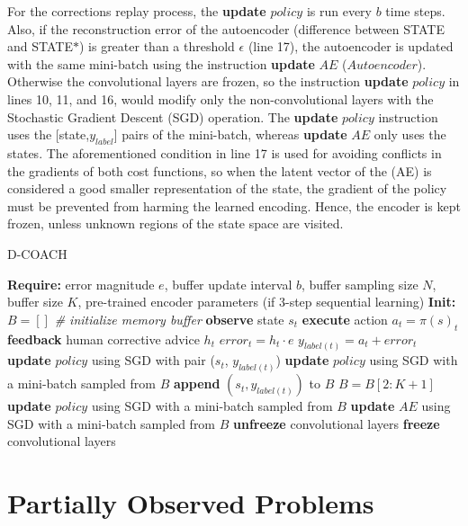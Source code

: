 For the corrections replay process, the \textbf{update} $policy$ is run every $b$ time steps. Also, if the reconstruction error of the autoencoder (difference between STATE and STATE$*$) is greater than a threshold $\epsilon$ (line 17), the autoencoder is updated with the same mini-batch using the instruction \textbf{update} $AE$ ($Autoencoder$). Otherwise the convolutional layers are frozen, so the instruction \textbf{update} $policy$ in lines 10, 11, and 16, would modify only the non-convolutional layers with the Stochastic Gradient Descent (SGD) operation. The \textbf{update} $policy$ instruction uses the [state,$y_{label}$] pairs of the mini-batch, whereas \textbf{update} $AE$ only uses the states. The aforementioned condition in line 17 is used for avoiding conflicts in the gradients of both cost functions, so when the latent vector of the (AE) is considered a good smaller representation of the state, the gradient of the policy must be prevented from harming the learned encoding. Hence, the encoder is kept frozen, unless unknown regions of the state space are visited.

\begin{algorithm}[t]
\caption{D-COACH }\label{algorithm:DeepCOACH}
\begin{algorithmic}[1]
\State \textbf{Require:} error magnitude $\textit{e}$, buffer update interval $b$, buffer sampling size $N$, buffer size $K$, pre-trained encoder parameters (if 3-step sequential learning) 
\State \textbf{Init:} $B = []$ \emph{\# initialize memory buffer}
\State \textbf{observe} state $s_{t}$
\State \textbf{execute} action $a_{t}=\pi(s)_{t}$
\State \textbf{feedback} human corrective advice $h_{t}$
\State $error_{t} = h_{t}\cdot e$
\State $y_{label(t)} = a_{t} + error_{t}$ 
\State \textbf{update} $policy$ using SGD with pair ($s_{t}$, $y_{label(t)}$) 
\State \textbf{update} $policy$ using SGD with a mini-batch sampled from $B$
\State \textbf{append} $(s_{t}, y_{label(t)})$ to $B$
\State $B = B[2:K+1]$
\EndIf
\EndIf
{}
\State \textbf{update} $policy$ using SGD with a mini-batch sampled from $B$
\State \textbf{update} $AE$ using SGD with a mini-batch sampled from $B$
\State \textbf{unfreeze} convolutional layers
\Else
\State \textbf{freeze} convolutional layers
\EndIf
\EndIf
\EndFor
\end{algorithmic}
\end{algorithm}

\section{Partially Observed Problems}
